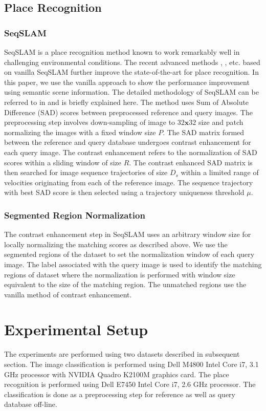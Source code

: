 \documentclass[twocolumn]{article}
\begin{document}
\subsection{Place Recognition}
\subsubsection{SeqSLAM}
SeqSLAM \cite{Milford2012} is a place recognition method known to work remarkably well in challenging environmental conditions. The recent advanced methods \cite{milford2015sequence}, \cite{wang2015improved}, \cite{milford2015place} etc. based on vanilla SeqSLAM further improve the state-of-the-art for place recognition. In this paper, we use the vanilla approach to show the performance improvement using semantic scene information. The detailed methodology of SeqSLAM can be referred to in \cite{Milford2012} and is briefly explained here. The method uses Sum of Absolute Difference (SAD) scores between preprocessed reference and query images. The preprocessing step involves down-sampling of image to $32\mathbf{x}32$ size and patch normalizing the images with a fixed window size $P$. The SAD matrix formed between the reference and query database undergoes contrast enhancement for each query image. The contrast enhancement refers to the normalization of SAD scores within a sliding window of size $R$. The contrast enhanced SAD matrix is then searched for image sequence trajectories of size $D_s$ within a limited range of velocities originating from each of the reference image. The sequence trajectory with best SAD score is then selected using a trajectory uniqueness threshold $\mu$.

\subsubsection{Segmented Region Normalization}
The contrast enhancement step in SeqSLAM uses an arbitrary window size for locally normalizing the matching scores as described above. We use the segmented regions of the dataset to set the normalization window of each query image. The label associated with the query image is used to identify the matching regions of dataset where the normalization is performed with window size equivalent to the size of the matching region. The unmatched regions use the vanilla method of contrast enhancement.

\section{Experimental Setup}
The experiments are performed using two datasets described in subsequent section. The image classification is performed using Dell M4800 Intel Core i7, 3.1 GHz processor with NVIDIA Quadro K2100M graphics card. The place recognition is performed using Dell E7450 Intel Core i7, 2.6 GHz processor. The classification is done as a preprocessing step for reference as well as query database off-line.
\end{document}
